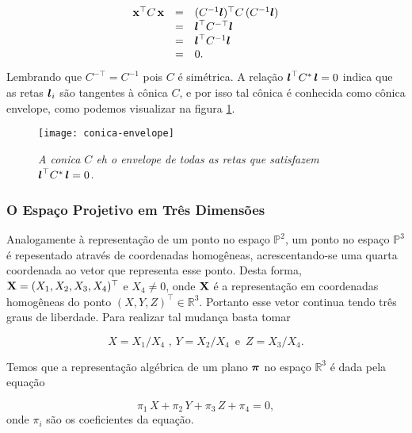 \begin{equation*}
\begin{array}{rcl}
\mathbf{x}^\top C\,\mathbf{x}&=&(C^{-1}\boldsymbol{l})^\top C\,(
C^{-1}\boldsymbol{l})\\
&=&\boldsymbol{l}^\top C^{-\top}\boldsymbol{l}\\
&=&\boldsymbol{l}^\top C^{-1}\boldsymbol{l}\\
&=&0.
\end{array}
\end{equation*}
Lembrando que $C^{-\top}=C^{-1}$ pois $C$ é simétrica. A relação $\boldsymbol{l}^\top C^*\,\boldsymbol{l}=0$ indica que as retas $\boldsymbol{l}_i$ são tangentes à cônica $C$, e por isso tal cônica é conhecida como cônica envelope, como podemos visualizar na figura \ref{fig.conica-envelope}.

\begin{figure}[!htb]
\centering
\texttt{[image: conica-envelope]}
\caption{\textit{A conica $C$ eh o envelope de todas as retas que satisfazem $\boldsymbol{l}^\top C^*\,\boldsymbol{l}=0$.}}
\label{fig.conica-envelope}
\end{figure}

\subsubsection{O Espaço Projetivo em Três Dimensões}




Analogamente à representação de um ponto no espaço $\mathbb{P}^2$, um ponto no espaço $\mathbb{P}^3$ é repesentado através de coordenadas homogêneas, acrescentando-se uma quarta coordenada ao vetor que representa esse ponto. Desta forma, $\mathbf{X} = (X_1,X_2,X_3,X_4)^\top$ e $X_4 \ne 0$, onde $\mathbf{X}$ é a representação em coordenadas homogêneas do ponto $(X,Y,Z)^\top \in \mathbb{R}^3$. Portanto esse vetor continua tendo três graus de liberdade. Para realizar tal mudança basta tomar 

\begin{equation*}
X=X_1/X_4 \,\, ,\, Y=X_2/X_4 \,\,\, \text{e} \,\,\, Z=X_3/X_4.
\end{equation*}

 


Temos que a representação algébrica de um plano $\boldsymbol{\pi}$ no espaço $\mathbb{R}^3$ é dada pela equação

\begin{equation*}
\pi_1\,X+\pi_2\,Y+\pi_3\,Z+\pi_4=0,
\end{equation*}
onde $\pi_i$ são os coeficientes da equação.

